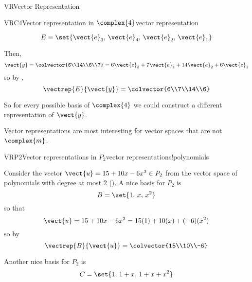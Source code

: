 \begin{subsect}{VR}{Vector Representation}
\begin{example}{VRC4}{Vector representation in $\complex{4}$}{vector representation}
\begin{para}
%
\begin{equation*}
E=\set{\vect{e}_3,\,\vect{e}_4,\,\vect{e}_2,\,\vect{e}_1}
\end{equation*}
\end{para}
%
\begin{para}Then,
%
\begin{equation*}
\vect{y}=\colvector{6\\14\\6\\7}=6\vect{e}_3+7\vect{e}_4+14\vect{e}_2+6\vect{e}_1
\end{equation*}
%
so by ,
%
\begin{equation*}
\vectrep{E}{\vect{y}}=\colvector{6\\7\\14\\6}
\end{equation*}
\end{para}
%
\begin{para}So for every possible basis of $\complex{4}$ we could construct a different representation of $\vect{y}$.\end{para}
%
\end{example}
%
\begin{para}Vector representations are most interesting for vector spaces that are not $\complex{m}$.\end{para}
%
\begin{example}{VRP2}{Vector representations in $P_2$}{vector representations!polynomials}
\begin{para}Consider the vector $\vect{u}=15+10x-6x^2\in P_2$ from the vector space of polynomials with degree at most 2 ().  A nice basis for $P_2$ is
%
\begin{equation*}
B=\set{1,\,x,\,x^2}
\end{equation*}
%
so that
%
\begin{equation*}
\vect{u}=15+10x-6x^2=15(1)+10(x)+(-6)(x^2)
\end{equation*}
%
so by 
%
\begin{equation*}
\vectrep{B}{\vect{u}}=\colvector{15\\10\\-6}
\end{equation*}
\end{para}
%
\begin{para}Another nice basis for $P_2$ is
%
\begin{equation*}
C=\set{1,\,1+x,\,1+x+x^2}
\end{equation*}

\end{para}
\end{example}
\end{subsect}
